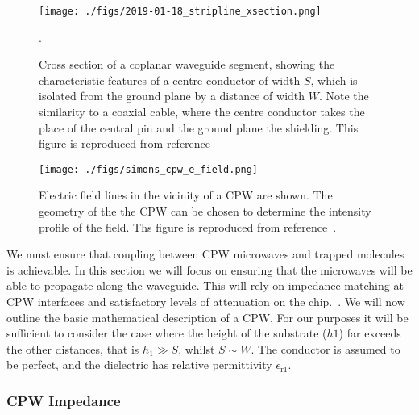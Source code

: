 
\begin{figure}
  \texttt{[image: ./figs/2019-01-18\_stripline\_xsection.png]}
  \caption{
    Cross section of a coplanar waveguide segment, showing the characteristic
    features of a centre conductor of width $S$, which is isolated from the
    ground plane by a distance of width $W$. Note the similarity to a coaxial
    cable, where the centre conductor takes the place of the central pin and the
    ground plane the shielding. This figure is reproduced from
    reference~\cite{Simons2004}}.
  \label{experiment:fig:CPWxsec}
\end{figure}


\begin{figure}
  \texttt{[image: ./figs/simons\_cpw\_e\_field.png]}
  \caption{
    Electric field lines in the vicinity of a CPW are shown. The geometry of the 
    the CPW can be chosen to determine the intensity profile of the field. Ths
    figure is reproduced from reference~\cite{Simons2004}.
  }
  \label{experiment:fig:CPWfield}
\end{figure}

We must ensure that coupling between CPW microwaves and trapped molecules is
achievable. In this section we will focus on ensuring that the microwaves will
be able to propagate along the waveguide. This will rely on impedance matching
at CPW interfaces and satisfactory levels of attenuation on the
chip.~\cite{Jackson1975, Simons2004}. We will now outline the basic mathematical
description of a CPW.  For our purposes it will be sufficient to consider the
case where the height of the substrate ($h1$) far exceeds the other distances,
that is $h_1 \gg S$, whilst $S \sim W$. The conductor is assumed to be perfect,
and the dielectric has relative permittivity $\epsilon_\mathrm{r1}$.

\subsubsection{CPW Impedance}

